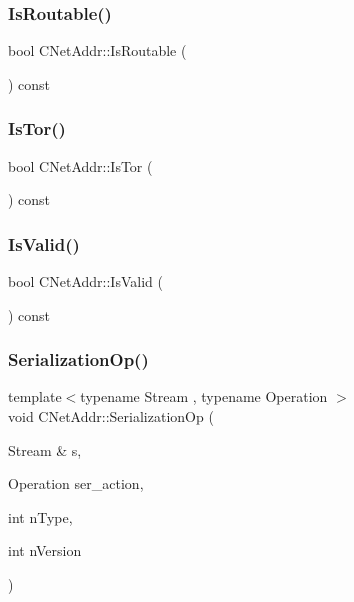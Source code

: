 \mbox{\label{class_c_net_addr_a4e3b2fea2a6151c76684b3812df4a5c3}} 
\subsubsection{\texorpdfstring{Is\+Routable()}{IsRoutable()}}
{\footnotesize\ttfamily bool C\+Net\+Addr\+::\+Is\+Routable (\begin{DoxyParamCaption}{ }\end{DoxyParamCaption}) const}

\mbox{\label{class_c_net_addr_a4db37b4997ff3b8c57959f2aa915a9a3}} 
\subsubsection{\texorpdfstring{Is\+Tor()}{IsTor()}}
{\footnotesize\ttfamily bool C\+Net\+Addr\+::\+Is\+Tor (\begin{DoxyParamCaption}{ }\end{DoxyParamCaption}) const}

\mbox{\label{class_c_net_addr_a6fe20b8da9701ca5dc2af078e2e8ac25}} 
\subsubsection{\texorpdfstring{Is\+Valid()}{IsValid()}}
{\footnotesize\ttfamily bool C\+Net\+Addr\+::\+Is\+Valid (\begin{DoxyParamCaption}{ }\end{DoxyParamCaption}) const}

\mbox{\label{class_c_net_addr_a7c914d155a533f64f8aa0d2f9bfff8a7}} 
\subsubsection{\texorpdfstring{Serialization\+Op()}{SerializationOp()}}
{\footnotesize\ttfamily template$<$typename Stream , typename Operation $>$ \\
void C\+Net\+Addr\+::\+Serialization\+Op (\begin{DoxyParamCaption}\item[{Stream \&}]{s,  }\item[{Operation}]{ser\+\_\+action,  }\item[{int}]{n\+Type,  }\item[{int}]{n\+Version }\end{DoxyParamCaption})\hspace{0.3cm}{\ttfamily [inline]}}

